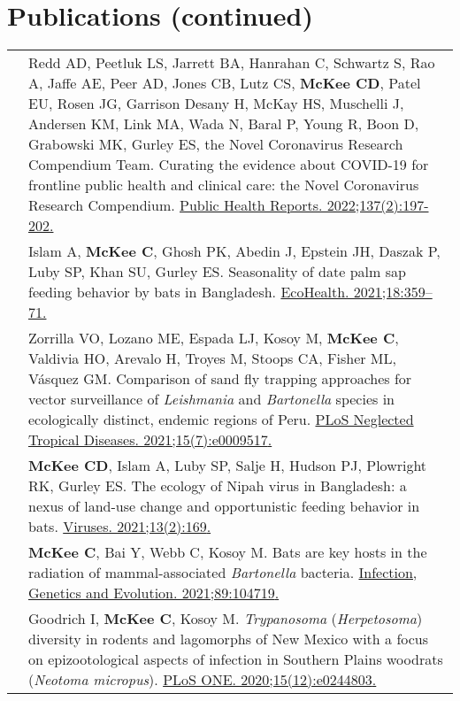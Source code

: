 \documentclass[letterpaper]{deedy-resume} %
\begin{document}
\section{Publications (continued)}
\begin{tabular}{>{\raggedright\arraybackslash}p{2cm}p{16cm}}

2022 & Redd AD, Peetluk LS, Jarrett BA, Hanrahan C, Schwartz S, Rao A, Jaffe AE, Peer AD, Jones CB, Lutz CS, \textbf{McKee CD}, Patel EU, Rosen JG,  Garrison Desany H, McKay HS, Muschelli J, Andersen KM, Link MA, Wada N, Baral P, Young R, Boon D, Grabowski MK, Gurley ES, the Novel Coronavirus Research Compendium Team. Curating the evidence about COVID-19 for frontline public health and clinical care: the Novel Coronavirus Research Compendium. \href{https://doi.org/10.1177/00333549211058732}{\textcolor{special}{Public Health Reports. 2022;137(2):197-202}.} \\

2021 & Islam A, \textbf{McKee C}, Ghosh PK, Abedin J, Epstein JH, Daszak P, Luby SP, Khan SU,
Gurley ES. Seasonality of date palm sap feeding behavior by bats in Bangladesh. \href{https://doi.org/10.1007/s10393-021-01561-9}{\textcolor{special}{EcoHealth. 2021;18:359–71}.} \\

2021 & Zorrilla VO, Lozano ME, Espada LJ, Kosoy M, \textbf{McKee C}, Valdivia HO, Arevalo H, Troyes M, Stoops CA, Fisher ML, Vásquez GM. Comparison of sand fly trapping approaches for vector surveillance of \textit{Leishmania} and \textit{Bartonella} species in ecologically distinct, endemic regions of Peru. \href{https://doi.org/10.1371/journal.pntd.0009517}{\textcolor{special}{PLoS Neglected Tropical Diseases. 2021;15(7):e0009517}.} \\

2021 & \textbf{McKee CD}, Islam A, Luby SP, Salje H, Hudson PJ, Plowright RK, Gurley ES. The ecology of Nipah virus in Bangladesh: a nexus of land-use change and opportunistic feeding behavior in bats. \href{https://doi.org/10.3390/v13020169}{\textcolor{special}{Viruses. 2021;13(2):169}.} \\

2021 & \textbf{McKee C}, Bai Y, Webb C, Kosoy M. Bats are key hosts in the radiation of mammal-associated \textit{Bartonella} bacteria. \href{https://doi.org/10.1016/j.meegid.2021.104719}{\textcolor{special}{Infection, Genetics and Evolution. 2021;89:104719}.} \\

2020 & Goodrich I, \textbf{McKee C}, Kosoy M. \textit{Trypanosoma} (\textit{Herpetosoma}) diversity in rodents and lagomorphs of New Mexico with a focus on epizootological aspects of infection in Southern Plains woodrats (\textit{Neotoma micropus}). \href{https://dx.plos.org/10.1371/journal.pone.0244803}{\textcolor{special}{PLoS ONE. 2020;15(12):e0244803}.} \\


\end{tabular}
\end{document}
